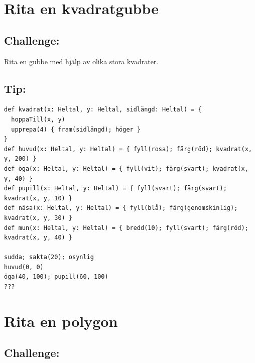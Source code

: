 \chapter{Rita en kvadratgubbe}\section*{\color{BrickRed}Challenge:}
Rita en gubbe med hjälp av olika stora kvadrater.
\\


  
\section*{\color{OliveGreen}Tip:}

\begin{lstlisting}[basicstyle={\ttfamily\fontsize{14}{17}\selectfont},numbers=none]
def kvadrat(x: Heltal, y: Heltal, sidlängd: Heltal) = {
  hoppaTill(x, y)
  upprepa(4) { fram(sidlängd); höger }
}
def huvud(x: Heltal, y: Heltal) = { fyll(rosa); färg(röd); kvadrat(x, y, 200) }
def öga(x: Heltal, y: Heltal) = { fyll(vit); färg(svart); kvadrat(x, y, 40) }
def pupill(x: Heltal, y: Heltal) = { fyll(svart); färg(svart); kvadrat(x, y, 10) }
def näsa(x: Heltal, y: Heltal) = { fyll(blå); färg(genomskinlig); kvadrat(x, y, 30) }
def mun(x: Heltal, y: Heltal) = { bredd(10); fyll(svart); färg(röd); kvadrat(x, y, 40) }

sudda; sakta(20); osynlig
huvud(0, 0)
öga(40, 100); pupill(60, 100)
???
\end{lstlisting}
        
\chapter{Rita en polygon}\section*{\color{BrickRed}Challenge:}


